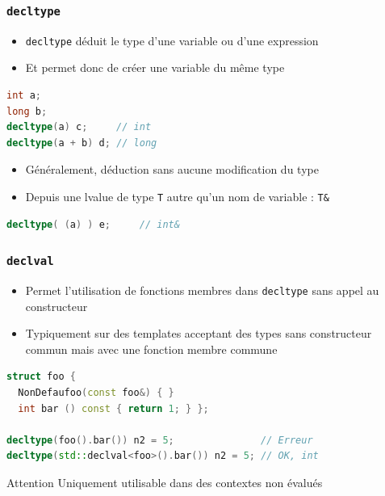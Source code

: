 \documentclass[C++.tex]{subfiles}
\begin{document}
\begin{frame}[fragile]
	\frametitle{\lstinline|decltype|}
	\begin{itemize}
		\item \lstinline|decltype| déduit le type d'une variable ou d'une expression
		\item Et permet donc de créer une variable du même type
	\end{itemize}

	\begin{lstlisting}[language=C++]
int a;
long b;
decltype(a) c;     // int
decltype(a + b) d; // long\end{lstlisting}

	\begin{itemize}
		\item Généralement, déduction sans aucune modification du type


		\item Depuis une lvalue de type \lstinline|T| autre qu'un nom de variable : \lstinline|T&|
	\end{itemize}

	\begin{lstlisting}[language=C++]
decltype( (a) ) e;     // int&\end{lstlisting}

\end{frame}

\begin{frame}[fragile]
	\frametitle{\lstinline|declval|}
	\begin{itemize}
		\item Permet l'utilisation de fonctions membres dans \lstinline|decltype| sans appel au constructeur
		\item Typiquement sur des templates acceptant des types sans constructeur commun mais avec une fonction membre commune
	\end{itemize}
	
	\begin{lstlisting}[language=C++]
struct foo {
  NonDefaufoo(const foo&) { }
  int bar () const { return 1; } };

decltype(foo().bar()) n2 = 5;               // Erreur
decltype(std::declval<foo>().bar()) n2 = 5; // OK, int\end{lstlisting}

	\begin{alertblock}{Attention}
		Uniquement utilisable dans des contextes non évalués
	\end{alertblock}
\end{frame}
\end{document}
